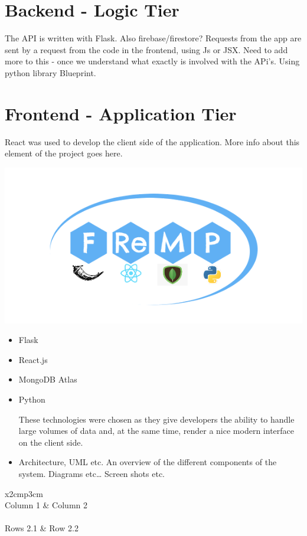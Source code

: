 \section{Backend - Logic Tier}
The API is written with Flask. Also firebase/firestore? 
Requests from the app are sent by a request from the code in the frontend, using Js or JSX.
Need to add more to this - once we understand what exactly is involved with the APi's.
Using python library Blueprint.

\section{Frontend - Application Tier}
React was used to develop the client side of the application. 
More info about this element of the project goes here.
\begin{center}    
      \includegraphics{img/fremp.PNG}
\end{center}

\begin{itemize}
\item Flask
\item React.js
\item MongoDB Atlas
\item Python

These technologies were chosen as they give developers the ability to handle large volumes of data and, at the same time, render a nice modern interface on the client side. 
\item Architecture, UML etc. An overview of the different components of the system. Diagrams etc… Screen shots etc.
\end{itemize}

\begin{table}[h]
  \centering
  \begin{tabular}{x{2cm}p{3cm}}
    \toprule \\
    Column 1 & Column 2 \\
    \midrule \\
    Rows 2.1 & Row 2.2 \\
    \bottomrule
  \end{tabular}
  \caption{A table.}
  \label{table:mytable}
\end{table}

